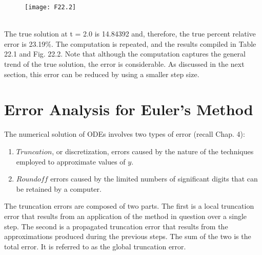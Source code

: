 \begin{figure}[hbt!]
	\texttt{[image: F22.2]}
	\label{F22.2}
\end{figure}\\
The true solution at t = 2.0 is 14.84392 and, therefore, the true percent relative error is
23.19\%. The computation is repeated, and the results compiled in Table 22.1 and Fig. 22.2.
Note that although the computation captures the general trend of the true solution, the error
is considerable. As discussed in the next section, this error can be reduced by using a
smaller step size.

\section{Error Analysis for Euler’s Method}

The numerical solution of ODEs involves two types of error (recall Chap. 4):
\begin{enumerate}
\item $Truncation$, or discretization, errors caused by the nature of the techniques employed
to approximate values of $y$.
\item $Roundoff$ errors caused by the limited numbers of significant digits that can be retained
by a computer.
\end{enumerate}

The truncation errors are composed of two parts. The first is a local truncation error that results from an application of the method in question over a single step. The second is
a propagated truncation error that results from the approximations produced during the previous steps. The sum of the two is the total error. It is referred to as the global truncation error.

